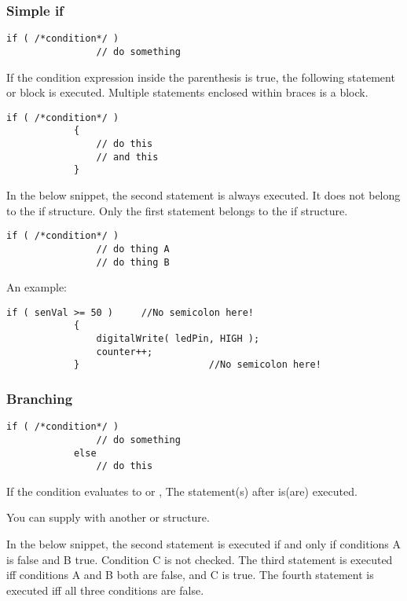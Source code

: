 \documentclass{article}
\begin{document}
		\subsubsection{Simple if}

			\begin{lstlisting}[gobble=12]
			if ( /*condition*/ )
				// do something
			\end{lstlisting}

			If the condition expression inside the parenthesis is true, the following statement or block is executed. Multiple statements enclosed within braces is a block.

			\begin{lstlisting}[gobble=12]
			if ( /*condition*/ )
			{
				// do this
				// and this
			}
			\end{lstlisting}

			In the below snippet, the second statement is always executed. It does not belong to the if structure. Only the first statement belongs to the if structure.

			\begin{lstlisting}[gobble=12]
			if ( /*condition*/ )
				// do thing A
				// do thing B
			\end{lstlisting}

			An example:

			\begin{lstlisting}[gobble=12]
			if ( senVal >= 50 )		//No semicolon here!
			{
				digitalWrite( ledPin, HIGH );
				counter++;
			}						//No semicolon here!
			\end{lstlisting}

		\subsubsection{Branching}

			\begin{lstlisting}[gobble=12]
			if ( /*condition*/ )
				// do something
			else 
				// do this
			\end{lstlisting}

			If the condition evaluates to  or , The statement(s) after  is(are) executed.

			You can supply  with another  or  structure. 

			In the below snippet, the second statement is executed if and only if conditions A is false and B true. Condition C is not checked. The third statement is executed iff conditions A and B both are false, and C is true. The fourth statement is executed iff all three conditions are false.
\end{document}
